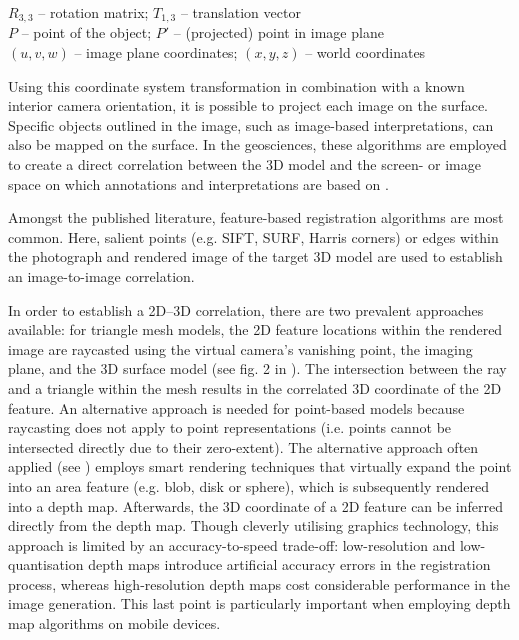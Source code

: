 \documentclass[review]{elsarticle}
\begin{document}
\begin{center}
$R_{3,3}$ -- rotation matrix; $T_{1,3}$ -- translation vector \\$P$ -- point of the object; $P'$ -- (projected) point in image plane \\$(u,v,w)$ -- image plane coordinates; $(x,y,z)$ -- world coordinates
\end{center}


Using this coordinate system transformation in combination with a known interior camera orientation, it is possible to project each image on the surface. Specific objects outlined in the image, such as image-based interpretations, can also be mapped on the surface. In the geosciences, these algorithms are employed to create a direct correlation between the 3D model and the screen- or image space on which annotations and interpretations are based on \cite{Kehl2016_ISPRS}.

Amongst the published literature, feature-based registration algorithms are most common. Here, salient points (e.g. SIFT, SURF, Harris corners) or edges within the photograph and rendered image of the target 3D model are used to establish an image-to-image correlation. 

In order to establish a 2D--3D correlation, there are two prevalent approaches available: for triangle mesh models, the 2D feature locations within the rendered image are raycasted using the virtual camera's vanishing point, the imaging plane, and the 3D surface model (see fig. 2 in \cite{Kehl2016_ISPRS}). The intersection between the ray and a triangle within the mesh results in the correlated 3D coordinate of the 2D feature. An alternative approach is needed for point-based models because raycasting does not apply to point representations (i.e. points cannot be intersected directly due to their zero-extent). The alternative approach often applied (see \cite{Sibbing2013,Sattler2011,Rodriguez2012,Garcia2015}) employs smart rendering techniques that virtually expand the point into an area feature (e.g. blob, disk or sphere), which is subsequently rendered into a depth map. Afterwards, the 3D coordinate of a 2D feature can be inferred directly from the depth map. Though cleverly utilising graphics technology, this approach is limited by an accuracy-to-speed trade-off: low-resolution and low-quantisation depth maps introduce artificial accuracy errors in the registration process, whereas high-resolution depth maps cost considerable performance in the image generation. This last point is particularly important when employing depth map algorithms on mobile devices.
\end{document}
